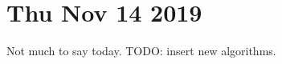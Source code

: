 \documentclass[main.tex]{subfiles}
\begin{document}
\section*{Thu Nov 14 2019}

Not much to say today.
TODO: insert new algorithms.
\end{document}
